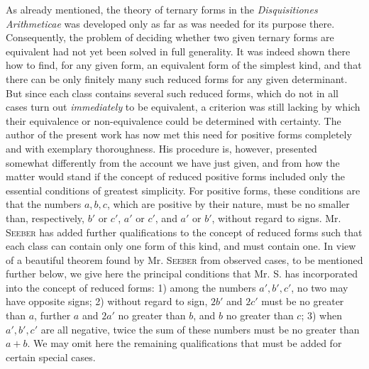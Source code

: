 As already mentioned, the theory of ternary forms in the \emph{Disquisitiones Arithmeticae} was developed only as far as was needed for its purpose there. Consequently, the problem of deciding whether two given ternary forms are equivalent had not yet been solved in full generality. It was indeed shown there how to find, for any given form, an equivalent form of the simplest kind, and that there can be only finitely many such reduced forms for any given determinant. But since each class contains several such reduced forms, which do not in all cases turn out \emph{immediately} to be equivalent, a criterion was still lacking by which their equivalence or non-equivalence could be determined with certainty. The author of the present work has now met this need for positive forms completely and with exemplary thoroughness. His procedure is, however, presented somewhat differently from the account we have just given, and from how the matter would stand if the concept of reduced positive forms included only the essential conditions of greatest simplicity. For positive forms, these conditions are that the numbers $a,b,c$, which are positive by their nature, must be no smaller than, respectively, $b'$ or $c'$, $a'$ or $c'$, and $a'$ or $b'$, without regard to signs. Mr. \textsc{Seeber} has added further qualifications to the concept of reduced forms such that each class can contain only one form of this kind, and must contain one. In view of a beautiful theorem found by Mr. \textsc{Seeber} from observed cases, to be mentioned further below, we give here the principal conditions that Mr. S. has incorporated into the concept of reduced forms:
1) among the numbers $a',b',c'$, no two may have opposite signs; 2) without regard to sign, $2b'$ and $2c'$ must be no greater than $a$, further $a$ and $2a'$ no greater than $b$, and $b$ no greater than $c$; 3) when $a',b',c'$ are all negative, twice the sum of these numbers must be no greater than $a+b$. We may omit here the remaining qualifications that must be added for certain special cases.

